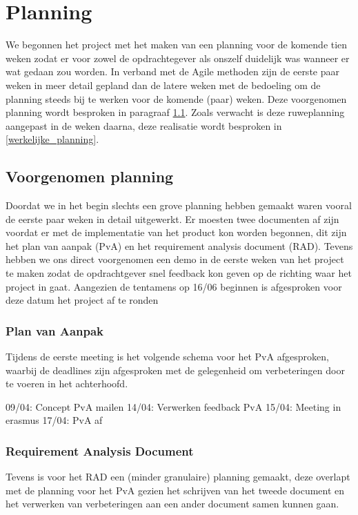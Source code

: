 \section{Planning}
\label{Planning}

We begonnen het project met het maken van een planning voor de komende tien
weken zodat er voor zowel de opdrachtegever als onszelf duidelijk was wanneer
er wat gedaan zou worden. In verband met de Agile methoden zijn de eerste paar
weken in meer detail gepland dan de latere weken met de bedoeling om de
planning steeds bij te werken voor de komende (paar) weken. Deze voorgenomen
planning wordt besproken in paragraaf \ref{voorgenomen_planning}. Zoals
verwacht is deze ruweplanning aangepast in de weken daarna, deze realisatie
wordt besproken in \ref{werkelijke_planning}.

\subsection{Voorgenomen planning}
\label{voorgenomen_planning}

Doordat we in het begin slechts een grove planning hebben gemaakt waren vooral
de eerste paar weken in detail uitgewerkt. Er moesten twee documenten af zijn
voordat er met de implementatie van het product kon worden begonnen, dit zijn
het plan van aanpak (PvA) en het requirement analysis document (RAD). Tevens
hebben we ons direct voorgenomen een demo in de eerste weken van het project te
maken zodat de opdrachtgever snel feedback kon geven op de richting waar het
project in gaat.
Aangezien de tentamens op 16/06 beginnen is afgesproken
voor deze datum het project af te ronden
\subsubsection{Plan van Aanpak}

Tijdens de eerste meeting is het volgende schema voor het PvA afgesproken,
waarbij de deadlines zijn afgesproken met de gelegenheid om verbeteringen
door te voeren in het achterhoofd.

09/04: Concept PvA mailen
14/04: Verwerken feedback PvA
15/04: Meeting in erasmus
17/04: PvA af

\subsubsection{Requirement Analysis Document}

Tevens is voor het RAD een (minder granulaire) planning gemaakt, deze overlapt
met de planning voor het PvA gezien het schrijven van het tweede document en
het verwerken van verbeteringen aan een ander document samen kunnen gaan.

